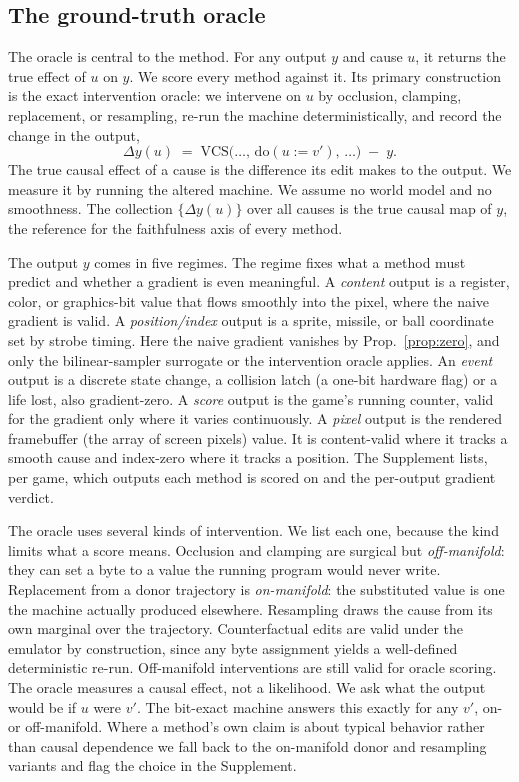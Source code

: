 \subsection{The ground-truth oracle}\label{sec:oracle}

The oracle is central to the method. For any output $y$ and cause $u$, it returns the true
effect of $u$ on $y$. We score every method against it. Its primary construction is the exact
intervention oracle: we intervene on $u$ by occlusion, clamping, replacement, or resampling,
re-run the machine deterministically, and record the change in the output,
\begin{equation}
  \Delta y(u) \;=\; \mathrm{VCS}\big(\dots,\, \mathrm{do}(u{:=}v'),\, \dots\big) \;-\; y .
  \label{eq:doy}
\end{equation}
The true causal effect of a cause is the difference its edit makes to the output. We measure
it by running the altered machine. We assume no world model and no smoothness. The collection
$\{\Delta y(u)\}$ over all causes is the true causal map of $y$, the reference for the
faithfulness axis of every method.

The output $y$ comes in five regimes. The regime fixes what a method must predict and whether
a gradient is even meaningful. A \emph{content} output is a register, color, or graphics-bit
value that flows smoothly into the pixel, where the naive gradient is valid. A
\emph{position/index} output is a sprite, missile, or ball coordinate set by strobe timing.
Here the naive gradient vanishes by Prop.~\ref{prop:zero}, and only the bilinear-sampler
surrogate or the intervention oracle applies. An \emph{event} output is a discrete state
change, a collision latch (a one-bit hardware flag) or a life lost, also gradient-zero. A \emph{score} output is the
game's running counter, valid for the gradient only where it varies continuously. A
\emph{pixel} output is the rendered framebuffer (the array of screen pixels) value. It is content-valid where it tracks a
smooth cause and index-zero where it tracks a position. The Supplement lists, per game, which
outputs each method is scored on and the per-output gradient verdict.

The oracle uses several kinds of intervention. We list each one, because the kind limits what
a score means. Occlusion and clamping are surgical but \emph{off-manifold}: they can set a
byte to a value the running program would never write. Replacement from a donor trajectory is
\emph{on-manifold}: the substituted value is one the machine actually produced elsewhere.
Resampling draws the cause from its own marginal over the trajectory. Counterfactual edits are
valid under the emulator by construction, since any byte assignment yields a well-defined
deterministic re-run. Off-manifold interventions are still valid for oracle scoring. The
oracle measures a causal effect, not a likelihood. We ask what the output would be if $u$ were
$v'$. The bit-exact machine answers this exactly for any $v'$, on- or off-manifold. Where a
method's own claim is about typical behavior rather than causal dependence we fall back to the
on-manifold donor and resampling variants and flag the choice in the Supplement.

